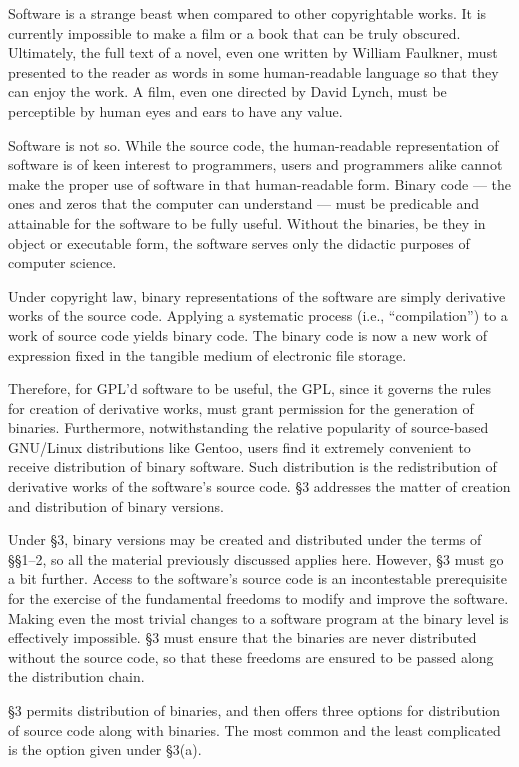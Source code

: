 \documentclass[12pt]{report}
\begin{document}
Software is a strange beast when compared to other copyrightable works.
It is currently impossible to make a film or a book that can be truly
obscured.  Ultimately, the full text of a novel, even one written by
William Faulkner, must presented to the reader as words in some
human-readable language so that they can enjoy the work.  A film, even one
directed by David Lynch, must be perceptible by human eyes and ears to
have any value.

Software is not so.  While the source code, the human-readable
representation of software is of keen interest to programmers, users and
programmers alike cannot make the proper use of software in that
human-readable form.  Binary code --- the ones and zeros that the computer
can understand --- must be predicable and attainable for the software to
be fully useful.  Without the binaries, be they in object or executable
form, the software serves only the didactic purposes of computer science.

Under copyright law, binary representations of the software are simply
derivative works of the source code.  Applying a systematic process (i.e.,
``compilation'') to a work of source code yields binary code.  The binary
code is now a new work of expression fixed in the tangible medium of
electronic file storage.

Therefore, for GPL'd software to be useful, the GPL, since it governs the
rules for creation of derivative works, must grant permission for the
generation of binaries.  Furthermore, notwithstanding the relative
popularity of source-based GNU/Linux distributions like Gentoo, users find
it extremely convenient to receive distribution of binary software.  Such
distribution is the redistribution of derivative works of the software's
source code.  \S 3 addresses the matter of creation and distribution of
binary versions.

Under \S 3, binary versions may be created and distributed under the terms
of \S\S 1--2, so all the material previously discussed applies here.
However, \S 3 must go a bit further.  Access to the software's source code
is an incontestable prerequisite for the exercise of the fundamental
freedoms to modify and improve the software.  Making even the most trivial
changes to a software program at the binary level is effectively
impossible.  \S 3 must ensure that the binaries are never distributed
without the source code, so that these freedoms are ensured to be passed
along the distribution chain.

\S 3 permits distribution of binaries, and then offers three options for
distribution of source code along with binaries.  The most common and the
least complicated is the option given under \S 3(a).
\end{document}
